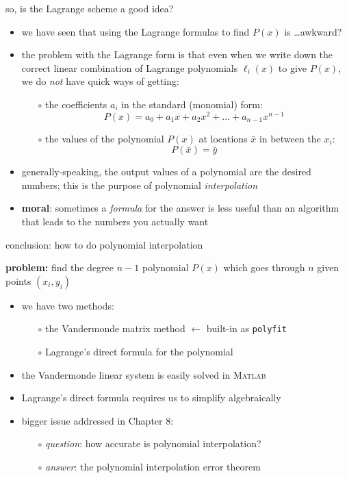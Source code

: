 \documentclass[10pt,hyperref]{beamer}
\newcommand{\Matlab}{\textsc{Matlab}\xspace}
\newcommand{\MO}{\Matlab}
\begin{document}
\begin{frame}{so, is the Lagrange scheme a good idea?}

\begin{itemize}
\item we have seen that using the Lagrange formulas to find $P(x)$ is \dots awkward?
\item the problem with the Lagrange form is that even when we write down the correct linear combination of Lagrange polynomials $\ell_i(x)$ to give $P(x)$, we do \emph{not} have quick ways of getting:
  \begin{itemize}
  \item[$\circ$] the coefficients $a_i$ in the standard (monomial) form:
    	$$P(x) = a_0 + a_1 x + a_2 x^2 + \dots + a_{n-1} x^{n-1}$$
  \item[$\circ$] the values of the polynomial $P(x)$ at locations $\bar x$ in between the $x_i$:
    $$P(\bar x) = \bar y$$
  \end{itemize}
\item generally-speaking, the output values of a polynomial are the desired numbers; this is the purpose of polynomial \emph{interpolation}
\item \textbf{moral}:  sometimes a \emph{formula} for the answer is less useful than an algorithm that leads to the numbers you actually want
\end{itemize}
\end{frame}


\begin{frame}{conclusion: how to do polynomial interpolation}

\noindent \textbf{problem:} find the degree $n-1$ polynomial $P(x)$ which goes through $n$ given points $(x_i,y_i)$

\bigskip
\begin{itemize}
\item we have two methods:
  \begin{itemize}
  \item[$\circ$]  the Vandermonde matrix method \hfill {\footnotesize $\leftarrow$ built-in as \texttt{polyfit}}
  \item[$\circ$]  Lagrange's direct formula for the polynomial
  \end{itemize}
\item the Vandermonde linear system is easily solved in \MO
\item Lagrange's direct formula requires us to simplify algebraically
\item bigger issue addressed in Chapter 8:
  \begin{itemize}
  \item[$\circ$] \emph{question}: how accurate is polynomial interpolation?
  \item[$\circ$] \emph{answer}: the polynomial interpolation error theorem
  \end{itemize}
\end{itemize}
\end{frame}
\end{document}
